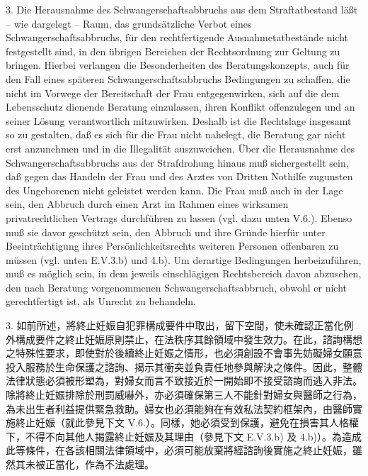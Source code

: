 \documentclass[12pt]{article}
\begin{document}
\begin{sourcepara}[title={原文D.103}]
3. Die Herausnahme des Schwangerschaftsabbruchs aus dem Straftatbestand läßt -- wie dargelegt -- Raum, das grundsätzliche Verbot eines Schwangerschaftsabbruchs, für den rechtfertigende Ausnahmetatbestände nicht festgestellt sind, in den übrigen Bereichen der Rechtsordnung zur Geltung zu bringen. Hierbei verlangen die Besonderheiten des Beratungskonzepts, auch für den Fall eines späteren Schwangerschaftsabbruchs Bedingungen zu schaffen, die nicht im Vorwege der Bereitschaft der Frau entgegenwirken, sich auf die dem Lebensschutz dienende Beratung einzulassen, ihren Konflikt offenzulegen und an seiner Lösung verantwortlich mitzuwirken. Deshalb ist die Rechtslage insgesamt so zu gestalten, daß es sich für die Frau nicht nahelegt, die Beratung gar nicht erst anzunehmen und in die Illegalität auszuweichen. Über die Herausnahme des Schwangerschaftsabbruchs aus der Strafdrohung hinaus muß sichergestellt sein, daß gegen das Handeln der Frau und des Arztes von Dritten Nothilfe zugunsten des Ungeborenen nicht geleistet werden kann. Die Frau muß auch in der Lage sein, den Abbruch durch einen Arzt im Rahmen eines wirksamen privatrechtlichen Vertrags durchführen zu lassen (vgl. dazu unten V.6.). Ebenso muß sie davor geschützt sein, den Abbruch und ihre Gründe hierfür unter Beeinträchtigung ihres Persönlichkeitsrechts weiteren Personen offenbaren zu müssen (vgl. unten E.V.3.b) und 4.b). Um derartige Bedingungen herbeizuführen, muß es möglich sein, in dem jeweils einschlägigen Rechtsbereich davon abzusehen, den nach Beratung vorgenommenen Schwangerschaftsabbruch, obwohl er nicht gerechtfertigt ist, als Unrecht zu behandeln.
\end{sourcepara}
\begin{transpara}
3. 如前所述，將終止妊娠自犯罪構成要件中取出，留下空間，使未確認正當化例外構成要件之終止妊娠原則禁止，在法秩序其餘領域中發生效力。在此，諮詢構想之特殊性要求，即使對於後續終止妊娠之情形，也必須創設不會事先妨礙婦女願意投入服務於生命保護之諮詢、揭示其衝突並負責任地參與解決之條件。因此，整體法律狀態必須被形塑為，對婦女而言不致接近於一開始即不接受諮詢而逃入非法。除將終止妊娠排除於刑罰威嚇外，亦必須確保第三人不能針對婦女與醫師之行為，為未出生者利益提供緊急救助。婦女也必須能夠在有效私法契約框架內，由醫師實施終止妊娠（就此參見下文 V.6.）。同樣，她必須受到保護，避免在損害其人格權下，不得不向其他人揭露終止妊娠及其理由（參見下文 E.V.3.b) 及 4.b)）。為造成此等條件，在各該相關法律領域中，必須可能放棄將經諮詢後實施之終止妊娠，雖然其未被正當化，作為不法處理。
\end{transpara}
\end{document}
